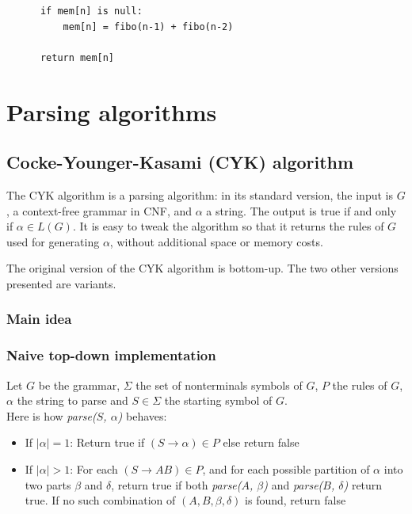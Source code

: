 \documentclass[]{article}
\begin{document}
\begin{multicols}{2}
\begin{lstlisting}
      if mem[n] is null:
          mem[n] = fibo(n-1) + fibo(n-2)
          
      return mem[n]
\end{lstlisting}

\newpage
\section{Parsing algorithms}
\subsection{Cocke-Younger-Kasami (CYK) algorithm}
The CYK algorithm is a parsing algorithm: in its standard version, the input is
$G$, a context-free
grammar in CNF, and $\alpha$ a string. The output is true if and only if $\alpha\in L(G)$.
It is easy to tweak the algorithm so that it returns the rules of $G$ used for
generating $\alpha$, without additional space or memory costs.

The original version of the CYK algorithm is bottom-up. The two other versions
presented are variants.

\subsubsection{Main idea}
\subsubsection{Naive top-down implementation}
Let $G$ be the grammar, $\Sigma$ the set of nonterminals symbols of $G$, $P$ the rules of $G$, $\alpha$ the string to parse and $S\in \Sigma$ the starting symbol of $G$.\\
Here is how \textit{parse($S$, $\alpha$)} behaves:
\begin{itemize}
\item If $|\alpha|=1$: Return true if $(S\rightarrow\alpha)\in P$ else return false
\item If $|\alpha|>1$: For each $(S\rightarrow AB)\in P$, and for each possible partition of $\alpha$ into two parts $\beta$ and $\delta$, return true if
both \textit{parse($A$, $\beta$)} and \textit{parse($B$, $\delta$)} return true. If no such combination of $(A,B,\beta,\delta)$ is found, return false
\end{itemize}


\end{multicols}
\end{document}
